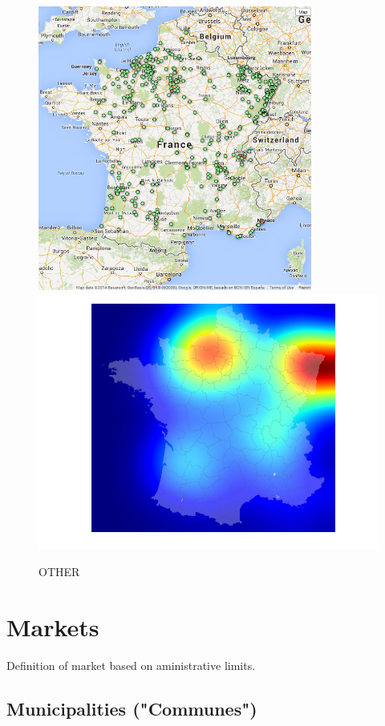 \documentclass[11pt]{article}
\begin{document}
\begin{figure}[H]
    \caption{OTHER}
	\centering
		\includegraphics[width=9cm]{images/maps_group_dots/AUTRE.png}
        \includegraphics[width=12.8cm]{images/maps_group_heatmaps/AUTRE.png}
\end{figure}

\section{Markets}

Definition of market based on aministrative limits.

\subsection{Municipalities ("Communes")}
\end{document}
